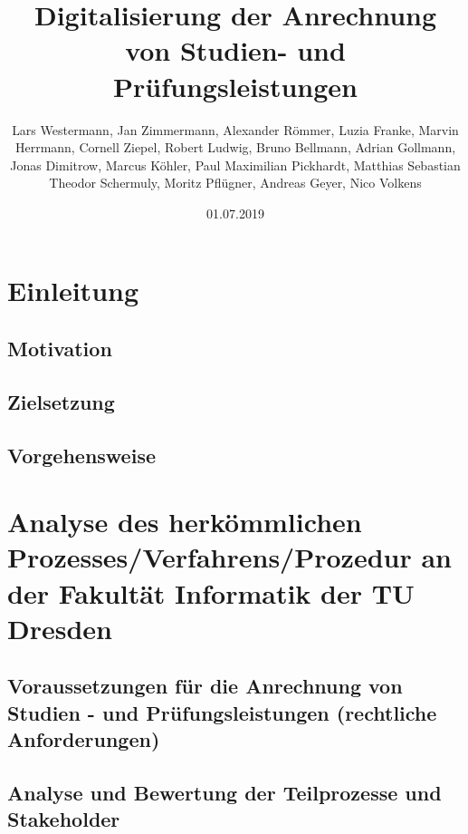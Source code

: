 \documentclass[ngerman]{tudscrreprt}
\begin{document}
\date{01.07.2019}
\author{Lars Westermann, Jan Zimmermann, Alexander Römmer, Luzia Franke, Marvin Herrmann, Cornell Ziepel, Robert Ludwig, Bruno Bellmann, Adrian Gollmann, Jonas Dimitrow, Marcus Köhler, Paul Maximilian Pickhardt, Matthias Sebastian Theodor Schermuly, Moritz Pflügner, Andreas Geyer, Nico Volkens}
\title{Digitalisierung der Anrechnung von Studien- und Prüfungsleistungen}
\maketitle

\tableofcontents

\chapter{Einleitung}

\section{Motivation}

\section{Zielsetzung}

\section{Vorgehensweise}

\chapter{Analyse des herkömmlichen Prozesses/Verfahrens/Prozedur an der Fakultät Informatik der TU Dresden}

\section{Voraussetzungen für die Anrechnung von Studien - und Prüfungsleistungen (rechtliche Anforderungen)}

\section{Analyse und Bewertung der Teilprozesse und Stakeholder}
\end{document}
